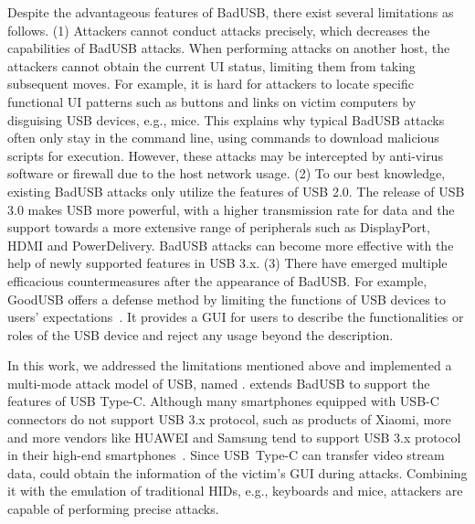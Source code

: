 Despite the advantageous features of BadUSB, there exist several limitations as
follows.  (1) Attackers cannot conduct attacks precisely, which decreases the
capabilities of BadUSB attacks.  When performing attacks on another host, the
attackers cannot obtain the current \ac{UI} status, limiting
them from taking subsequent moves.  For example, it is hard for attackers to
locate specific functional \ac{UI} patterns such as buttons and links on victim
computers by disguising \ac{USB} devices, e.g., mice.  This explains why typical
BadUSB attacks often only stay in the command line, using commands to download
malicious scripts for execution.  However, these attacks may be intercepted by
anti-virus software or firewall due to the host network usage.  (2) To
our best knowledge, existing BadUSB attacks only utilize the features of \ac{USB}
2.0.  The release of \ac{USB} 3.0 makes \ac{USB} more powerful, with a higher
transmission rate for data and the support towards a more extensive range of
peripherals such as DisplayPort, HDMI and PowerDelivery.  BadUSB attacks
can become more effective with the help of newly supported features in \ac{USB} 3.x.
(3) There have emerged multiple efficacious countermeasures after the
appearance of BadUSB.  For example, GoodUSB offers a defense method by limiting
the functions of \ac{USB} devices to users' expectations~\cite{tian2015defending}.
It provides a \ac{GUI} for users to describe the functionalities or
roles of the \ac{USB} device and reject any usage beyond the description.

In this work, we addressed the limitations mentioned
above and implemented a multi-mode attack model of \ac{USB}, named \tool.  \tool
extends BadUSB to support the features of \ac{USB} Type-C.
Although many smartphones equipped with USB-C connectors do not support \ac{USB} 3.x protocol, such as products of Xiaomi, more and more vendors like HUAWEI and Samsung tend to support \ac{USB} 3.x protocol in their \mbox{high-end} smartphones~\cite{usbclist}.
Since \mbox{\ac{USB} Type-C} can transfer video stream data, \tool could obtain the information of the
victim's \ac{GUI} during attacks.  Combining it with the emulation
of traditional \acp{HID}, e.g., keyboards and mice, attackers are capable of
performing precise attacks.

